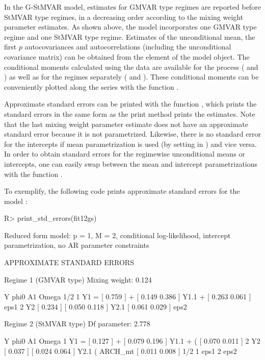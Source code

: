 \documentclass[nojss]{jss} %
\begin{document}
In the G-StMVAR model, estimates for GMVAR type regimes are reported before StMVAR type regimes, in a decreasing order according to the mixing weight parameter estimates. As shown above, the model  incorporates one GMVAR type regime and one StMVAR type regime. Estimates of the unconditional mean, the first $p$ autocovariances and autocorrelations (including the unconditional covariance matrix) can be obtained from the element  of the model object. The conditional moments calculated using the data are available for the process ( and ) as well as for the regimes separately ( and ). These conditional moments can be conveniently plotted along the series with the function .

Approximate standard errors can be printed with the function , which prints the standard errors in the same form as the print method prints the estimates. Note that the last mixing weight parameter estimate does not have an approximate standard error because it is not parametrized. Likewise, there is no standard error for the intercepts if mean parametrization is used (by setting  in ) and vice versa. In order to obtain standard errors for the regimewise unconditional means or intercepts, one can easily swap between the mean and intercept parametrizations with the function .

To exemplify, the following code prints approximate standard errors for the model :
%
\begin{Schunk}
\begin{Sinput}
R> print_std_errors(fit12gs)
\end{Sinput}
\begin{Soutput}
Reduced form model:
p = 1, M = 2, conditional log-likelihood, intercept parametrization, no AR parameter constraints 

APPROXIMATE STANDARD ERRORS

Regime 1 (GMVAR type)
Mixing weight: 0.124 

   Y      phi0          A1                  Omega         1/2     
1 Y1 = [ 0.759 ] + [ 0.149 0.386 ] Y1.1 + [ 0.263 0.061 ]     eps1
2 Y2   [ 0.234 ]   [ 0.050 0.118 ] Y2.1   [ 0.061 0.029 ]     eps2

Regime 2 (StMVAR type)
Df parameter:  2.778 

   Y      phi0          A1                            Omega        
1 Y1 = [ 0.127 ] + [ 0.079 0.196 ] Y1.1 + (         [ 0.070 0.011 ]
2 Y2   [ 0.037 ]   [ 0.024 0.064 ] Y2.1   ( ARCH_mt [ 0.011 0.008 ]
  1/2     
1     eps1
2     eps2
\end{Soutput}
\end{Schunk}
%
\end{document}
